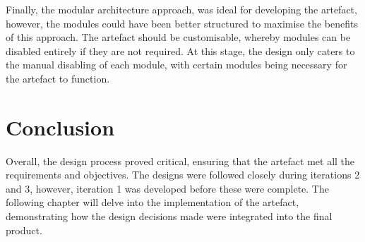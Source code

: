 Finally, the modular architecture approach, was ideal for developing the artefact, however, the modules could have been better structured to maximise the benefits of this approach. The artefact should be customisable, whereby modules can be disabled entirely if they are not required. At this stage, the design only caters to the manual disabling of each module, with certain modules being necessary for the artefact to function.

\section{Conclusion}
\label{design:conclusion}

Overall, the design process proved critical, ensuring that the artefact met all the requirements and objectives. The designs were followed closely during iterations 2 and 3, however, iteration 1 was developed before these were complete. The following chapter will delve into the implementation of the artefact, demonstrating how the design decisions made were integrated into the final product.
